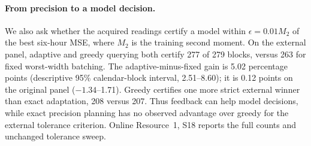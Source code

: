 \paragraph{From precision to a model decision.}
We also ask whether the acquired readings certify a model within
$\epsilon=0.01M_2$ of the best six-hour MSE, where $M_2$ is the training
second moment. On the external panel, adaptive and greedy querying both
certify 277 of 279 blocks, versus 263 for fixed worst-width batching.
The adaptive-minus-fixed gain is 5.02 percentage points (descriptive 95\%
calendar-block interval, 2.51--8.60); it is 0.12 points on the original
panel ($-1.34$--1.71). Greedy certifies one more strict external winner than
exact adaptation, 208 versus 207. Thus feedback can help model decisions,
while exact precision planning has no observed advantage over greedy for
the external tolerance criterion. Online Resource~1, S18 reports the
full counts and unchanged tolerance sweep.
